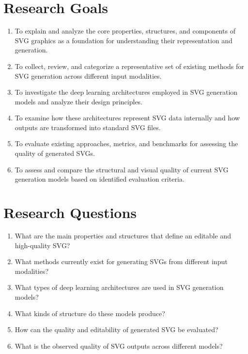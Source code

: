 \section{Research Goals}

\begin{enumerate}
    \item To explain and analyze the core properties, 
    structures, and components of SVG graphics as a 
    foundation for understanding their representation 
    and generation.
    \item To collect, review, and categorize a 
    representative set of existing methods for SVG 
    generation across different input modalities.
    \item To investigate the deep learning architectures 
    employed in SVG generation models and analyze their 
    design principles.
    \item To examine how these architectures represent 
    SVG data internally and how outputs are transformed 
    into standard SVG files.
    \item To evaluate existing approaches, metrics, and 
    benchmarks for assessing the quality of generated 
    SVGs.
    \item To assess and compare the structural and visual 
    quality of current SVG generation models based on 
    identified evaluation criteria.
\end{enumerate}


\section{Research Questions}

\begin{enumerate}
    \item What are the main properties and structures 
    that define an editable and high-quality SVG?
    \item What methods currently exist for 
    generating SVGs from different input modalities?
    \item What types of deep learning architectures are 
    used in SVG generation models?
    \item What kinds of structure do these models produce?
    \item How can the quality and editability of generated 
    SVG be evaluated?
    \item What is the observed quality of SVG outputs 
    across different models?
\end{enumerate}

